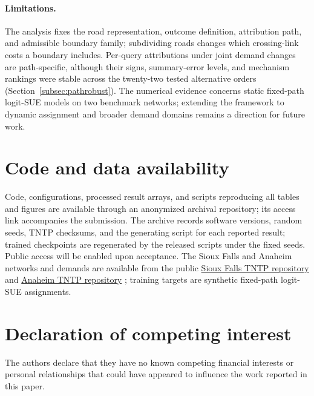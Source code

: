 \documentclass[a4paper,fleqn]{cas-sc}
\begin{document}
\paragraph{Limitations.}
The analysis fixes the road representation, outcome definition,
attribution path, and admissible boundary family; subdividing roads
changes which crossing-link costs a boundary includes. Per-query
attributions under joint demand changes are path-specific, although
their signs, summary-error levels, and mechanism rankings were stable
across the twenty-two tested alternative orders
(Section~\ref{subsec:pathrobust}). The numerical evidence concerns
static fixed-path logit-SUE models on two benchmark networks; extending
the framework to dynamic assignment and broader demand domains remains
a direction for future work.

\section*{Code and data availability}
Code, configurations, processed result arrays, and scripts reproducing
all tables and figures are available through an anonymized archival
repository; its access link accompanies the submission. The archive
records software versions, random seeds,
TNTP checksums, and the generating script for each reported result;
trained checkpoints are regenerated by the released scripts under the
fixed seeds. Public access will be enabled upon acceptance.
The Sioux Falls and Anaheim networks and demands are available from the public
\href{https://github.com/bstabler/TransportationNetworks/tree/master/SiouxFalls}{Sioux Falls TNTP repository}
and \href{https://github.com/bstabler/TransportationNetworks/tree/master/Anaheim}{Anaheim TNTP repository}
\citep{tnfrc2024transportation}; training targets are synthetic fixed-path
logit-SUE assignments.
\section*{Declaration of competing interest}
The authors declare that they have no known competing financial interests
or personal relationships that could have appeared to influence the work
reported in this paper.
\FloatBarrier

\setlength{\bibsep}{0.8pt plus 0.2pt}

\appendix
{}



\end{document}
